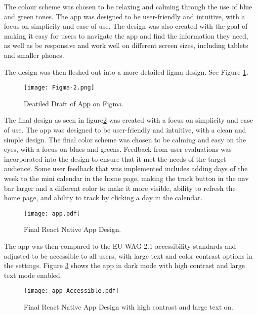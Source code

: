 The colour scheme was chosen to be relaxing and calming  through the use of blue and green tones. The app was designed to be user-friendly and intuitive, with a focus on simplicity and ease of use. The design was also created with the goal of making it easy for users to navigate the app and find the information they need, as well as be responsive and work well on different screen sizes, including tablets and smaller phones.  

The design was then fleshed out into a more detailed figma design. See Figure \ref{figure:figma-2}.

\begin{figure}[h!!]
  \begin{center}
    \texttt{[image: Figma-2.png]}
    \caption{Deatiled Draft of App on Figma.}
    \label{figure:figma-2}
  \end{center}
\end{figure}

The final design as seen in figure\ref{figure:app} was created with a focus on simplicity and ease of use. The app was designed to be user-friendly and intuitive, with a clean and simple design. The final color scheme was chosen to be calming and easy on the eyes, with a focus on blues and greens. Feedback from user evaluations was incorporated into the design to ensure that it met the needs of the target audience. Some user feedback that was implemented includes adding days of the week to the mini calendar in the home page, making the track button in the nav bar larger and a different color to make it more visible, ability to refresh the home page, and ability to track by clicking a day in the calendar. 

\begin{figure}[h!!]
  \begin{center}
    \texttt{[image: app.pdf]}
    \caption{Final React Native App Design.}
    \label{figure:app}
  \end{center}
\end{figure}


The app was then compared to the EU WAG 2.1 accessibility standards and adjusted to be accessible to all users, with large text and color contrast options in the settings. Figure \ref{figure:app-Accessible} shows the app in dark mode with high contrast and large text mode enabled.
 
\begin{figure}[h!!]
  \begin{center}
    \texttt{[image: app-Accessible.pdf]}
    \caption{Final React Native App Design with high contrast and large text on.}
    \label{figure:app-Accessible}
  \end{center}
\end{figure}

